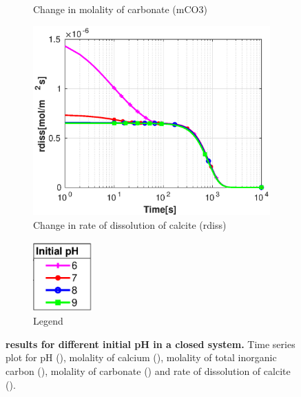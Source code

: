 \begin{figure}[!h]
\begin{subfigure}{.5\linewidth}
        \caption{\small Change in molality of carbonate (mCO3)}
        \label{fig:withoutvelmCO3}
    \end{subfigure}%
    \hfill
    \begin{subfigure}{.5\linewidth}
        \centering
        \includegraphics[width=\textwidth]{PICTURES/without_vel_rdiss.eps}
        \caption{\small Change in rate of dissolution of calcite (rdiss)}
        \label{fig:withoutvelrdiss}
    \end{subfigure}%
    \hfill
    \begin{subfigure}{.5\linewidth}
        \centering
        \includegraphics[width=0.25\textwidth]{PICTURES/with_pH_legend.eps}
        \caption{\small Legend}
        \label{fig:withoutvellegend}
    \end{subfigure}%
     \caption [\MATLAB results for different initial pH in a closed system.] {\textbf{\MATLAB results for different initial pH in a closed system.} 
     \small Time series plot for pH (), molality of calcium (), 
     molality of total inorganic carbon (), molality of carbonate () 
     and rate of dissolution of calcite ().}
     \label{fig:MATLABcomparisionDiffInitialpH}
\end{figure}

